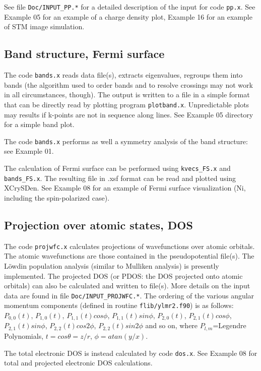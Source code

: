 \documentclass[12pt,a4paper]{article}
\begin{document}
See file \texttt{Doc/INPUT\_PP.*} for a detailed description of the input for code \texttt{pp.x}.
See Example 05 for an example of a charge density plot, Example 16
for an example of STM image simulation.

\subsection{Band structure, Fermi surface}

The code \texttt{bands.x} reads data file(s), extracts eigenvalues,
regroups them into bands (the algorithm used to order bands and to resolve
crossings may not work in all circumstances, though). The output is written
to a file in a simple format that can be directly read by plotting program
\texttt{plotband.x}. Unpredictable plots may results if k-points are not in sequence
along lines. See Example 05 directory for a simple band plot.

The code \texttt{bands.x} performs as well a symmetry analysis of the band structure:
see Example 01. 

The calculation of Fermi surface can be performed using 
\texttt{kvecs\_FS.x} and
\texttt{bands\_FS.x}. The resulting file in .xsf format can be read and plotted
using XCrySDen. See Example 08 for an example of Fermi surface 
visualization (Ni, including the spin-polarized case).

\subsection{Projection over atomic states, DOS}

The code \texttt{projwfc.x} calculates projections of wavefunctions
over atomic orbitals. The atomic wavefunctions are those contained
in the pseudopotential file(s). The L\"owdin population analysis (similar to
Mulliken analysis) is presently implemented. The projected DOS (or PDOS:
the DOS projected onto atomic orbitals) can also be calculated and written
to file(s). More details on the input data are found in file
\texttt{Doc/INPUT\_PROJWFC.*}. The ordering of the various 
angular momentum components (defined in routine \texttt{flib/ylmr2.f90})
is as follows:
$P_{0,0}(t)$, $P_{1,0}(t)$, $P_{1,1}(t)cos\phi$, $P_{1,1}(t)sin\phi$,
 $P_{2,0}(t)$, $P_{2,1}(t)cos\phi$, $P_{2,1}(t)sin\phi$, 
 $P_{2,2}(t)cos2\phi$, $P_{2,2}(t)sin2\phi$
and so on, where $P_{l,m}$=Legendre Polynomials, 
$t = cos\theta = z/r$, $\phi= atan(y /x)$.

The total electronic DOS is instead calculated by code
\texttt{dos.x}. See Example 08 for total and projected 
electronic DOS calculations.
\end{document}
